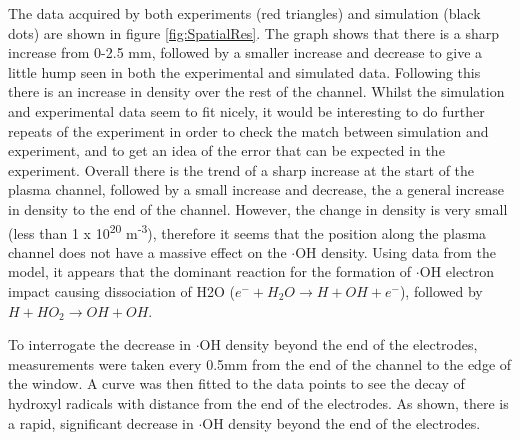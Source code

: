 \documentclass[11pt, oneside]{article}   	%
\begin{document}
The data acquired by both experiments (red triangles) and simulation (black dots) are shown in figure \ref{fig:SpatialRes}.
The graph shows that there is a sharp increase from 0-2.5 mm, followed by a smaller increase and decrease to give a little hump seen in both the experimental and simulated data. Following this there is an increase in density over the rest of the channel.
Whilst the simulation and experimental data seem to fit nicely, it would be interesting to do further repeats of the experiment in order to check the match between simulation and experiment, and to get an idea of the error that can be expected in the experiment.
Overall there is the trend of a sharp increase at the start of the plasma channel, followed by a small increase and decrease, the a general increase in density to the end of the channel. 
However, the change in density is very small (less than 1 x 10\textsuperscript{20} m\textsuperscript{-3}), therefore it seems that the position along the plasma channel does not have a massive effect on the $\cdot$OH density.
Using data from the model, it appears that the dominant reaction for the formation of $\cdot$OH electron impact causing dissociation of H2O ($e^- + H_2O \rightarrow H + OH + e^-$), followed by $H + HO_2 \rightarrow OH + OH$.

To interrogate the decrease in $\cdot$OH density beyond the end of the electrodes, measurements were taken every 0.5mm from the end of the channel to the edge of the window.
A curve was then fitted to the data points to see the decay of hydroxyl radicals with distance from the end of the electrodes.
As shown, there is a rapid, significant decrease in $\cdot$OH density beyond the end of the electrodes.
\end{document}
